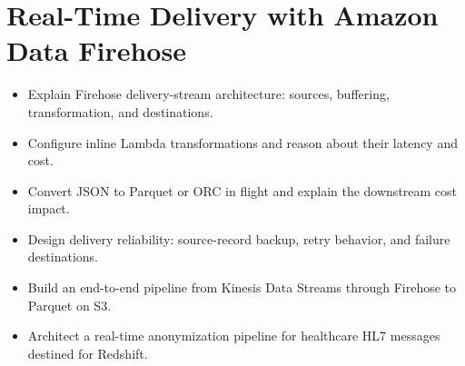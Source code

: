 \chapter{Real-Time Delivery with Amazon Data Firehose}
%
\begin{objectives}
\begin{itemize}
    \item Explain Firehose delivery-stream architecture: sources, buffering, transformation, and destinations.
    \item Configure inline Lambda transformations and reason about their latency and cost.
    \item Convert JSON to Parquet or ORC in flight and explain the downstream cost impact.
    \item Design delivery reliability: source-record backup, retry behavior, and failure destinations.
    \item Build an end-to-end pipeline from Kinesis Data Streams through Firehose to Parquet on S3.
    \item Architect a real-time anonymization pipeline for healthcare HL7 messages destined for Redshift.
\end{itemize}
\end{objectives}

